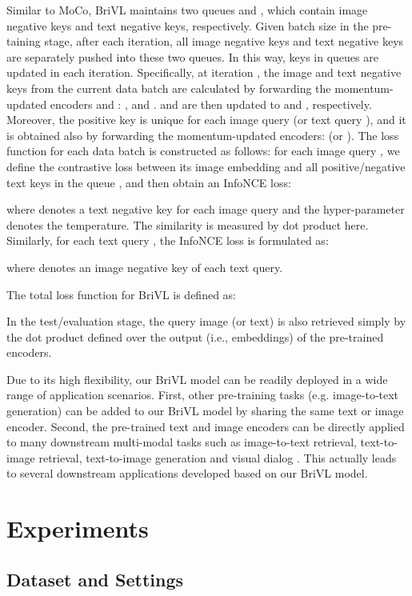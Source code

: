 \documentclass[10pt,twocolumn,letterpaper]{article}
\begin{document}
Similar to MoCo, BriVL maintains two queues  and , which contain  image negative keys and  text negative keys, respectively. Given batch size  in the pre-taining stage, after each iteration, all  image negative keys and  text negative keys are separately pushed into these two queues. In this way, keys in queues are updated in each iteration. Specifically, at iteration , the image and text negative keys from the current data batch  are calculated by forwarding the momentum-updated encoders  and : , and .  and  are then updated to  and , respectively. Moreover, the positive key is unique for each image query  (or text query ), and it is obtained also by forwarding the momentum-updated encoders:  (or ). The loss function for each data batch is constructed as follows: for each image query , we define the contrastive loss between its image embedding  and all positive/negative text keys in the queue , and then obtain an InfoNCE loss:

where  denotes a text negative key for each image query and the hyper-parameter  denotes the temperature. The similarity is measured by dot product here. Similarly, for each text query , the InfoNCE loss is formulated as:

where  denotes an image negative key of each text query.



The total loss function for BriVL is defined as:

In the test/evaluation stage, the query image (or text) is also retrieved simply by the dot product defined over the output (i.e., embeddings) of the pre-trained encoders.

Due to its high flexibility, our BriVL model can be readily deployed in a wide range of application scenarios. First, other pre-training tasks (e.g. image-to-text generation) can be added to our BriVL model by sharing the same text or image encoder. Second, the pre-trained text and image encoders can be directly applied to many downstream multi-modal tasks such as image-to-text retrieval, text-to-image retrieval, text-to-image generation \cite{reed2016generative} and visual dialog \cite{niu2019recursive}. This actually leads to several downstream applications developed based on our BriVL model. 

\section{Experiments}

\subsection{Dataset and Settings}
\end{document}
